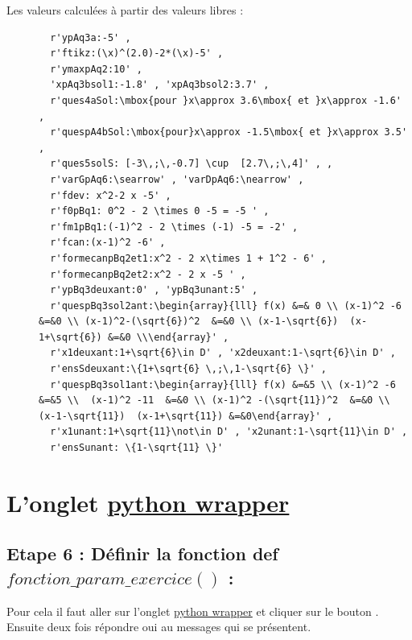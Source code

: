 {\begin{description}
 \item[Les valeurs calculées à partir des valeurs libres : ] 
 \begin{verbatim}
  r'ypAq3a:-5' , 
  r'ftikz:(\x)^(2.0)-2*(\x)-5' , 
  r'ymaxpAq2:10' ,  
  'xpAq3bsol1:-1.8' , 'xpAq3bsol2:3.7' ,
  r'ques4aSol:\mbox{pour }x\approx 3.6\mbox{ et }x\approx -1.6' ,  
  r'quespA4bSol:\mbox{pour}x\approx -1.5\mbox{ et }x\approx 3.5' , 
  r'ques5solS: [-3\,;\,-0.7] \cup  [2.7\,;\,4]' , , 
  r'varGpAq6:\searrow' , 'varDpAq6:\nearrow' ,  
  r'fdev: x^2-2 x -5' , 
  r'f0pBq1: 0^2 - 2 \times 0 -5 = -5 ' , 
  r'fm1pBq1:(-1)^2 - 2 \times (-1) -5 = -2' , 
  r'fcan:(x-1)^2 -6' , 
  r'formecanpBq2et1:x^2 - 2 x\times 1 + 1^2 - 6' , 
  r'formecanpBq2et2:x^2 - 2 x -5 ' , 
  r'ypBq3deuxant:0' , 'ypBq3unant:5' , 
  r'quespBq3sol2ant:\begin{array}{lll} f(x) &=& 0 \\ (x-1)^2 -6  &=&0 \\ (x-1)^2-(\sqrt{6})^2  &=&0 \\ (x-1-\sqrt{6})  (x-1+\sqrt{6}) &=&0 \\\end{array}' , 
  r'x1deuxant:1+\sqrt{6}\in D' , 'x2deuxant:1-\sqrt{6}\in D' , 
  r'ensSdeuxant:\{1+\sqrt{6} \,;\,1-\sqrt{6} \}' , 
  r'quespBq3sol1ant:\begin{array}{lll} f(x) &=&5 \\ (x-1)^2 -6  &=&5 \\  (x-1)^2 -11  &=&0 \\ (x-1)^2 -(\sqrt{11})^2  &=&0 \\ (x-1-\sqrt{11})  (x-1+\sqrt{11}) &=&0\end{array}' ,
  r'x1unant:1+\sqrt{11}\not\in D' , 'x2unant:1-\sqrt{11}\in D' , 
  r'ensSunant: \{1-\sqrt{11} \}'    
 \end{verbatim}

\end{description}


\section{L'onglet \underline{python wrapper}}
\subsection{Etape 6 : Définir la fonction def $fonction\_param\_exercice()$ : }

Pour cela il faut aller sur l'onglet \underline{python wrapper} et cliquer sur le bouton . 
Ensuite deux fois répondre oui au messages qui se présentent. 

}
